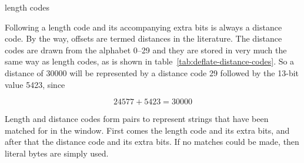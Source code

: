 \begin{table}
  \caption{ length codes}
  \label{tab:deflate-length-codes}
\end{table}

Following a length code and its accompanying extra bits is always a
distance code. By the way, offsets are termed distances in the 
literature. The distance codes are drawn from the alphabet 0--29 and
they are stored in very much the same way as length codes, as is shown
in table~\ref{tab:deflate-distance-codes}. So a distance of $30000$
will be represented by a distance code 29 followed by the 13-bit value
5423, since

\begin{equation*}
  24577 + 5423 = 30000
\end{equation*}

Length and distance codes form pairs to represent strings that have
been matched for in the window. First comes the length code and its
extra bits, and after that the distance code and its extra bits. If no
matches could be made, then literal bytes are simply used.

